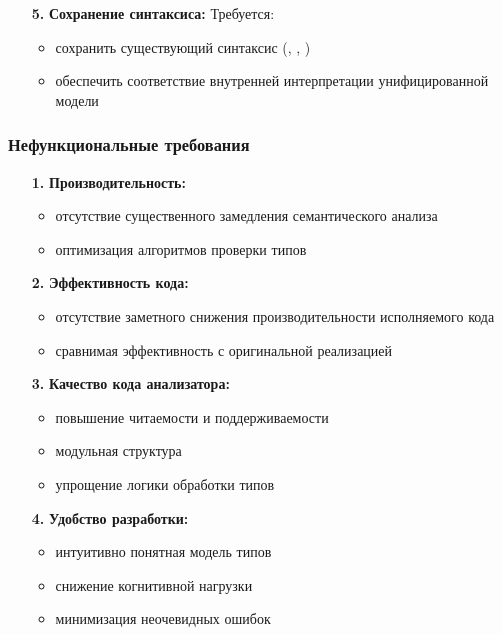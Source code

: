 \begin{enumerate}[leftmargin=*,align=left]
    \item[\textbf{5.}] \textbf{Сохранение синтаксиса:} Требуется:
    \begin{itemize}[label={--}]
        \item сохранить существующий синтаксис (, , )
        \item обеспечить соответствие внутренней интерпретации унифицированной модели
    \end{itemize}
\end{enumerate}

\subsubsection{Нефункциональные требования}
\begin{enumerate}[leftmargin=*,align=left]
    \item[\textbf{1.}] \textbf{Производительность:}
    \begin{itemize}[label={--}]
        \item отсутствие существенного замедления семантического анализа
        \item оптимизация алгоритмов проверки типов
    \end{itemize}

    \item[\textbf{2.}] \textbf{Эффективность кода:}
    \begin{itemize}[label={--}]
        \item отсутствие заметного снижения производительности исполняемого кода
        \item сравнимая эффективность с оригинальной реализацией
    \end{itemize}

    \item[\textbf{3.}] \textbf{Качество кода анализатора:}
    \begin{itemize}[label={--}]
        \item повышение читаемости и поддерживаемости
        \item модульная структура
        \item упрощение логики обработки типов
    \end{itemize}

    \item[\textbf{4.}] \textbf{Удобство разработки:}
    \begin{itemize}[label={--}]
        \item интуитивно понятная модель типов
        \item снижение когнитивной нагрузки
        \item минимизация неочевидных ошибок
    \end{itemize}
\end{enumerate}

